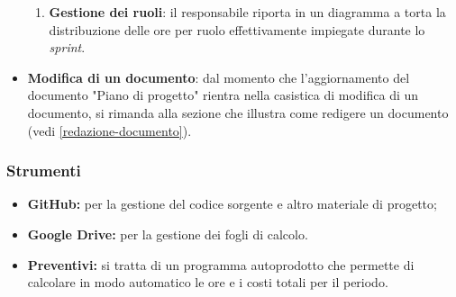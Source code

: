 \begin{itemize}
\begin{enumerate}
		      \item \textbf{Gestione dei ruoli}: il responsabile riporta in
		            un diagramma a torta la distribuzione delle ore per ruolo
		            effettivamente impiegate durante lo \textit{sprint}.
	      \end{enumerate}

	\item \textbf{Modifica di un documento}: dal momento che
	      l'aggiornamento del documento "Piano di progetto" rientra nella
	      casistica di modifica di un documento, si rimanda alla sezione
	      che illustra come redigere un documento (vedi
	      \ref{redazione-documento}).
\end{itemize}

\subsubsection{Strumenti}
\begin{itemize}
	\item \textbf{GitHub\g:} per la gestione del codice sorgente e altro
	      materiale di progetto;

	\item \textbf{Google Drive:} per la gestione dei fogli di calcolo.

	\item \textbf{Preventivi:} si tratta di un programma autoprodotto che
	      permette di calcolare in modo automatico le ore e i costi totali per
	      il periodo.
\end{itemize}

